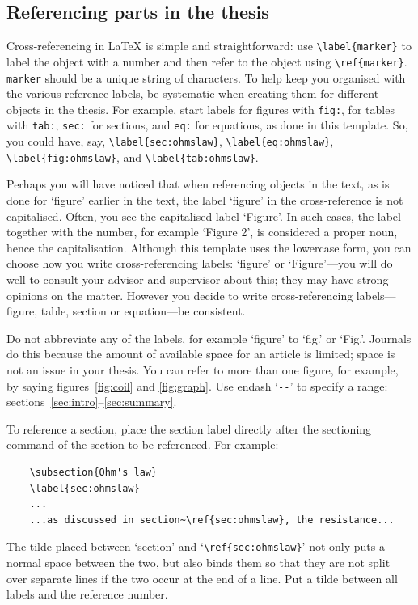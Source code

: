 \documentclass[english, 12pt, a4paper, elec, utf8, a-2b, online]{aaltothesis}
\begin{document}
\subsection{Referencing parts in the thesis}

Cross-referencing in \LaTeX{} is simple and straightforward: use 
\verb+\label{marker}+ to label the object with a number and then refer to the 
object using \verb+\ref{marker}+. \texttt{marker} should be a unique string of 
characters. To help keep you organised with the various reference labels, be 
systematic when creating them for different objects in the thesis. For example, 
start labels for figures with \texttt{fig:}, for tables with \texttt{tab:}, 
\texttt{sec:} for sections, and \texttt{eq:} for equations, as done in this 
template. So, you could have, say, \verb+\label{sec:ohmslaw}+, 
\verb+\label{eq:ohmslaw}+, \verb+\label{fig:ohmslaw}+, and 
\verb+\label{tab:ohmslaw}+.

Perhaps you will have noticed that when referencing objects in the text, as is 
done for `figure' earlier in the text, the label ‘figure’ in the cross-reference
is not capitalised. Often, you see the capitalised label ‘Figure’. In such 
cases, the label together with the number, for example ‘Figure 2’, is 
considered a proper noun, hence the capitalisation. Although this template uses 
the lowercase form, you can choose how you write cross-referencing labels: 
‘figure’ or ‘Figure’---you will do well to consult your advisor and supervisor 
about this; they may have strong opinions on the matter. However you decide to 
write cross-referencing labels---figure, table, section or equation---be 
consistent.

Do not abbreviate any of the labels, for example ‘figure’ to ‘fig.’ or ‘Fig.’. 
Journals do this because the amount of available space for an article is 
limited; space is not an issue in your thesis. You can refer to more than one 
figure, for example, by saying figures~\ref{fig:coil} and \ref{fig:graph}. Use 
endash `\verb+--+' to specify a range: sections~\ref{sec:intro}--\ref{sec:summary}.

To reference a section, place the section label directly after the sectioning 
command of the section to be referenced. For example:
\begin{verbatim}
	\subsection{Ohm's law}
	\label{sec:ohmslaw}
	...
	...as discussed in section~\ref{sec:ohmslaw}, the resistance...
\end{verbatim}
The tilde placed between `section' and `\verb+\ref{sec:ohmslaw}+' not only puts 
a normal space between the two, but also binds them so that they are not split 
over separate lines if the two occur at the end of a line. Put a tilde between 
all labels and the reference number.
\end{document}
